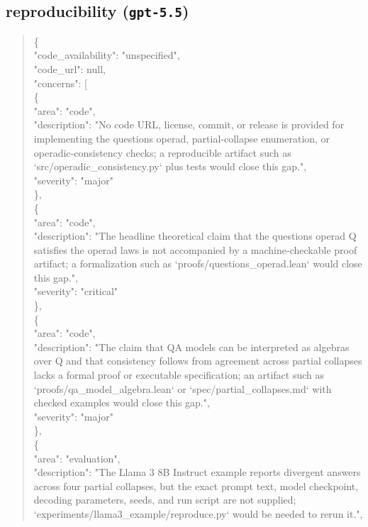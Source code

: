 \documentclass[11pt]{article}
\begin{document}
\subsection*{reproducibility (\texttt{gpt-5.5})}
\begin{quote}\small\ttfamily\raggedright
\{\\
  "code\_availability": "unspecified",\\
  "code\_url": null,\\
  "concerns": [\\
    \{\\
      "area": "code",\\
      "description": "No code URL, license, commit, or release is provided for implementing the questions operad, partial-collapse enumeration, or operadic-consistency checks; a reproducible artifact such as `src/operadic\_consistency.py` plus tests would close this gap.",\\
      "severity": "major"\\
    \},\\
    \{\\
      "area": "code",\\
      "description": "The headline theoretical claim that the questions operad Q satisfies the operad laws is not accompanied by a machine-checkable proof artifact; a formalization such as `proofs/questions\_operad.lean` would close this gap.",\\
      "severity": "critical"\\
    \},\\
    \{\\
      "area": "code",\\
      "description": "The claim that QA models can be interpreted as algebras over Q and that consistency follows from agreement across partial collapses lacks a formal proof or executable specification; an artifact such as `proofs/qa\_model\_algebra.lean` or `spec/partial\_collapses.md` with checked examples would close this gap.",\\
      "severity": "major"\\
    \},\\
    \{\\
      "area": "evaluation",\\
      "description": "The Llama 3 8B Instruct example reports divergent answers across four partial collapses, but the exact prompt text, model checkpoint, decoding parameters, seeds, and run script are not supplied; `experiments/llama3\_example/reproduce.py` would be needed to rerun it.",\\

\end{quote}
\end{document}
